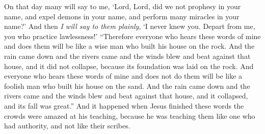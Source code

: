 \begin{biblechapter}
\verse On that day many will say to me, ‘Lord, Lord, did we not prophesy in your name, and expel demons in your name, and perform many miracles in your name?’
\verse And then \textit{I will say to them plainly}, ‘I never knew you. Depart from me, you who practice lawlessness!’
 “Therefore everyone who hears these words of mine and does them will be like a wise man who built his house on the rock.
\verse And the rain came down and the rivers came and the winds blew and beat against that house, and it did not collapse, because its foundation was laid on the rock.
\verse And everyone who hears these words of mine and does not do them will be like a foolish man who built his house on the sand.
\verse And the rain came down and the rivers came and the winds blew and beat against that house, and it collapsed, and its fall was great.”
 And it happened when Jesus finished these words the crowds were amazed at his teaching,
\verse because he was teaching them like one who had authority, and not like their scribes.
\end{biblechapter}

